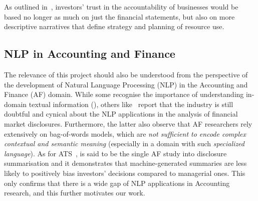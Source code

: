 As outlined in~\cite{elliott1998accounting}, investors’ trust in the accountability of businesses would be based no longer as much on just the financial statements, but also on more descriptive narratives that define strategy and planning of resource use.


\subsection{NLP in Accounting and Finance}\label{subsec:nlp-in-accounting-and-finance}
The relevance of this project should also be understood from the perspective of the development of Natural Language Processing (NLP) in the Accounting and Finance (AF) domain.
While some recognise the importance of understanding in-domain textual information (\cite{li2010textual}), others like~\cite{el-haj2019meaning} report that the industry is still doubtful and cynical about the NLP applications in the analysis of financial market disclosures.
Furthermore, the latter also observe that AF researchers rely extensively on bag-of-words models, which are \emph{not sufficient to encode complex contextual and semantic meaning} (especially in a domain with such \emph{specialized language}).
As for ATS~\cite{hollander-white-af}, is said to be the single AF study into disclosure summarisation and it demonstrates that machine-generated summaries are less likely to positively bias investors' decisions compared to managerial ones.
This only confirms that there is a wide gap of NLP applications in Accounting research, and this further motivates our work.
